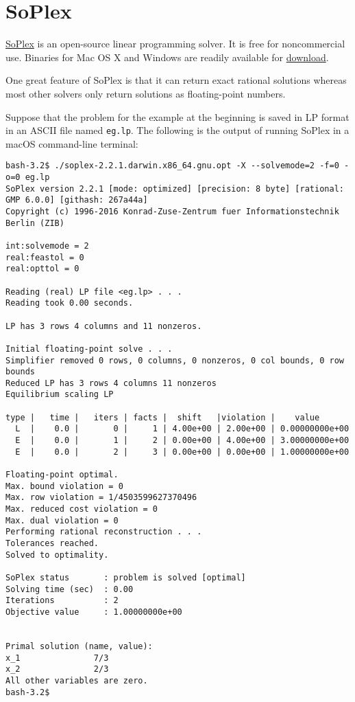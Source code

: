 \section{SoPlex}\label{soplex}

\href{http://soplex.zib.de/}{SoPlex} is an open-source linear
programming solver. It is free for noncommercial use.
Binaries for Mac OS X and Windows are readily available for
\href{http://soplex.zib.de/\#download}{download}.

One great feature of SoPlex is that it can return exact rational
solutions whereas most other solvers only return solutions as
floating-point numbers.

Suppose that the problem for the example at the beginning is saved in LP
format in an ASCII file named \texttt{eg.lp}. The following is the
output of running SoPlex in a macOS command-line terminal:

{\footnotesize
\begin{verbatim}
bash-3.2$ ./soplex-2.2.1.darwin.x86_64.gnu.opt -X --solvemode=2 -f=0 -o=0 eg.lp
SoPlex version 2.2.1 [mode: optimized] [precision: 8 byte] [rational: GMP 6.0.0] [githash: 267a44a]
Copyright (c) 1996-2016 Konrad-Zuse-Zentrum fuer Informationstechnik Berlin (ZIB)

int:solvemode = 2
real:feastol = 0
real:opttol = 0

Reading (real) LP file <eg.lp> . . .
Reading took 0.00 seconds.

LP has 3 rows 4 columns and 11 nonzeros.

Initial floating-point solve . . .
Simplifier removed 0 rows, 0 columns, 0 nonzeros, 0 col bounds, 0 row bounds
Reduced LP has 3 rows 4 columns 11 nonzeros
Equilibrium scaling LP

type |   time |   iters | facts |  shift   |violation |    value
  L  |    0.0 |       0 |     1 | 4.00e+00 | 2.00e+00 | 0.00000000e+00
  E  |    0.0 |       1 |     2 | 0.00e+00 | 4.00e+00 | 3.00000000e+00
  E  |    0.0 |       2 |     3 | 0.00e+00 | 0.00e+00 | 1.00000000e+00

Floating-point optimal.
Max. bound violation = 0
Max. row violation = 1/4503599627370496
Max. reduced cost violation = 0
Max. dual violation = 0
Performing rational reconstruction . . .
Tolerances reached.
Solved to optimality.

SoPlex status       : problem is solved [optimal]
Solving time (sec)  : 0.00
Iterations          : 2
Objective value     : 1.00000000e+00


Primal solution (name, value):
x_1               7/3
x_2               2/3
All other variables are zero.
bash-3.2$
\end{verbatim}
}

